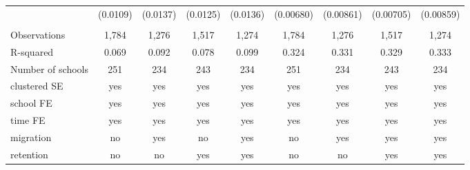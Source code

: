 \documentclass[12pt]{article}
\theoremstyle{plain}
\theoremstyle{plain}
\theoremstyle{plain}
\theoremstyle{definition}
\theoremstyle{plain}
\theoremstyle{definition}
\theoremstyle{plain}
\theoremstyle{remark}
\theoremstyle{definition}
\theoremstyle{definition}
\theoremstyle{plain}
\begin{document}
\begin{table}[H]
{\begin{tabular}{p{14.835em}llllllll}
			\multicolumn{1}{l}{} & \multicolumn{1}{c}{(0.0109)} & \multicolumn{1}{c}{(0.0137)} & \multicolumn{1}{c}{(0.0125)} & \multicolumn{1}{c}{(0.0136)} & \multicolumn{1}{c}{(0.00680)} & \multicolumn{1}{c}{(0.00861)} & \multicolumn{1}{c}{(0.00705)} & \multicolumn{1}{c}{(0.00859)} \\
			\multicolumn{1}{l}{} & \multicolumn{1}{c}{} & \multicolumn{1}{c}{} & \multicolumn{1}{c}{} & \multicolumn{1}{c}{} & \multicolumn{1}{c}{} & \multicolumn{1}{c}{} & \multicolumn{1}{c}{} & \multicolumn{1}{c}{} \\
			\multicolumn{1}{l}{Observations} & \multicolumn{1}{c}{1,784} & \multicolumn{1}{c}{1,276} & \multicolumn{1}{c}{1,517} & \multicolumn{1}{c}{1,274} & \multicolumn{1}{c}{1,784} & \multicolumn{1}{c}{1,276} & \multicolumn{1}{c}{1,517} & \multicolumn{1}{c}{1,274} \\
			\multicolumn{1}{l}{R-squared} & \multicolumn{1}{c}{0.069} & \multicolumn{1}{c}{0.092} & \multicolumn{1}{c}{0.078} & \multicolumn{1}{c}{0.099} & \multicolumn{1}{c}{0.324} & \multicolumn{1}{c}{0.331} & \multicolumn{1}{c}{0.329} & \multicolumn{1}{c}{0.333} \\
			\multicolumn{1}{l}{Number of schools} & \multicolumn{1}{c}{251} & \multicolumn{1}{c}{234} & \multicolumn{1}{c}{243} & \multicolumn{1}{c}{234} & \multicolumn{1}{c}{251} & \multicolumn{1}{c}{234} & \multicolumn{1}{c}{243} & \multicolumn{1}{c}{234} \\
			\multicolumn{1}{l}{clustered SE} & \multicolumn{1}{c}{yes} & \multicolumn{1}{c}{yes} & \multicolumn{1}{c}{yes} & \multicolumn{1}{c}{yes} & \multicolumn{1}{c}{yes} & \multicolumn{1}{c}{yes} & \multicolumn{1}{c}{yes} & \multicolumn{1}{c}{yes} \\
			\multicolumn{1}{l}{school FE} & \multicolumn{1}{c}{yes} & \multicolumn{1}{c}{yes} & \multicolumn{1}{c}{yes} & \multicolumn{1}{c}{yes} & \multicolumn{1}{c}{yes} & \multicolumn{1}{c}{yes} & \multicolumn{1}{c}{yes} & \multicolumn{1}{c}{yes} \\
			\multicolumn{1}{l}{time FE} & \multicolumn{1}{c}{yes} & \multicolumn{1}{c}{yes} & \multicolumn{1}{c}{yes} & \multicolumn{1}{c}{yes} & \multicolumn{1}{c}{yes} & \multicolumn{1}{c}{yes} & \multicolumn{1}{c}{yes} & \multicolumn{1}{c}{yes} \\
			\multicolumn{1}{l}{migration} & \multicolumn{1}{c}{no} & \multicolumn{1}{c}{yes} & \multicolumn{1}{c}{no} & \multicolumn{1}{c}{yes} & \multicolumn{1}{c}{no} & \multicolumn{1}{c}{yes} & \multicolumn{1}{c}{yes} & \multicolumn{1}{c}{yes} \\
			\multicolumn{1}{l}{retention} & \multicolumn{1}{c}{no} & \multicolumn{1}{c}{no} & \multicolumn{1}{c}{yes} & \multicolumn{1}{c}{yes} & \multicolumn{1}{c}{no} & \multicolumn{1}{c}{no} & \multicolumn{1}{c}{yes} & \multicolumn{1}{c}{yes} \\

\end{tabular}}
\end{table}
\end{document}
